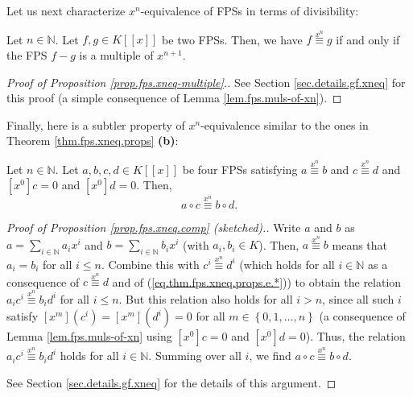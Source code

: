 Let us next characterize $x^{n}$-equivalence of FPSs in terms of divisibility:

\begin{proposition}
\label{prop.fps.xneq-multiple}Let $n\in\mathbb{N}$. Let $f,g\in K\left[
\left[  x\right]  \right]  $ be two FPSs. Then, we have $f\overset{x^{n}%
}{\equiv}g$ if and only if the FPS $f-g$ is a multiple of $x^{n+1}$.
\end{proposition}

\begin{proof}
[Proof of Proposition \ref{prop.fps.xneq-multiple}.]See Section
\ref{sec.details.gf.xneq} for this proof (a simple consequence of Lemma
\ref{lem.fps.muls-of-xn}).
\end{proof}

Finally, here is a subtler property of $x^{n}$-equivalence similar to the ones
in Theorem \ref{thm.fps.xneq.props} \textbf{(b)}:

\begin{proposition}
\label{prop.fps.xneq.comp}Let $n\in\mathbb{N}$. Let $a,b,c,d\in K\left[
\left[  x\right]  \right]  $ be four FPSs satisfying $a\overset{x^{n}}{\equiv
}b$ and $c\overset{x^{n}}{\equiv}d$ and $\left[  x^{0}\right]  c=0$ and
$\left[  x^{0}\right]  d=0$. Then,%
\[
a\circ c\overset{x^{n}}{\equiv}b\circ d.
\]

\end{proposition}

\begin{proof}
[Proof of Proposition \ref{prop.fps.xneq.comp} (sketched).]Write $a$ and $b$
as $a=\sum_{i\in\mathbb{N}}a_{i}x^{i}$ and $b=\sum_{i\in\mathbb{N}}b_{i}x^{i}$
(with $a_{i},b_{i}\in K$). Then, $a\overset{x^{n}}{\equiv}b$ means that
$a_{i}=b_{i}$ for all $i\leq n$. Combine this with $c^{i}\overset{x^{n}%
}{\equiv}d^{i}$ (which holds for all $i\in\mathbb{N}$ as a consequence of
$c\overset{x^{n}}{\equiv}d$ and of (\ref{eq.thm.fps.xneq.props.e.*})) to
obtain the relation $a_{i}c^{i}\overset{x^{n}}{\equiv}b_{i}d^{i}$ for all
$i\leq n$. But this relation also holds for all $i>n$, since all such $i$
satisfy $\left[  x^{m}\right]  \left(  c^{i}\right)  =\left[  x^{m}\right]
\left(  d^{i}\right)  =0$ for all $m\in\left\{  0,1,\ldots,n\right\}  $ (a
consequence of Lemma \ref{lem.fps.muls-of-xn} using $\left[  x^{0}\right]
c=0$ and $\left[  x^{0}\right]  d=0$). Thus, the relation $a_{i}%
c^{i}\overset{x^{n}}{\equiv}b_{i}d^{i}$ holds for all $i\in\mathbb{N}$.
Summing over all $i$, we find $a\circ c\overset{x^{n}}{\equiv}b\circ d$.

See Section \ref{sec.details.gf.xneq} for the details of this argument.
\end{proof}
